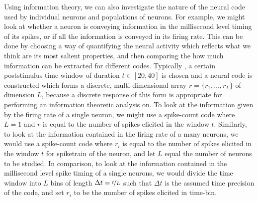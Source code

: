 Using information theory, we can also investigate the nature of the neural code used by individual neurons and populations of neurons.
For example, we might look at whether a neuron is conveying information in the millisecond level timing of its spikes, or if all the information is conveyed in its firing rate.
This can be done by choosing a way of quantifying the neural activity which reflects what we think are its most salient properties, and then comparing the how much information can be extracted for different codes.
Typically \cite{Quiroga2009,Brasselet2012,Panzeri2007,Arabzadeh2006,Strong1998}, a certain poststimulus time window of duration $t \in [20,40]$ is chosen and a neural code is constructed which forms a discrete, multi-dimensional array $r = \{r_1, \ldots, r_L\}$ of dimension $L$, because a discrete response of this form is appropriate for performing an information theoretic analysis on.
To look at the information given by the firing rate of a single neuron, we might use a spike-count code where $L=1$ and $r$ is equal to the number of spikes elicited in the window $t$.
Similarly, to look at the information contained in the firing rate of a many neurons, we would use a spike-count code where $r_i$ is equal to the number of spikes elicited in the window $t$ for spiketrain of the  neuron, and let $L$ equal the number of neurons to be studied.
In comparison, to look at the information contained in the millisecond level spike timing of a single neurons, we would divide the time window into $L$ bins of length $\Delta t = \nicefrac{t}{L}$ such that $\Delta t$ is the assumed time precision of the code, and set $r_i$ to be the number of spikes elicited in  time-bin.

